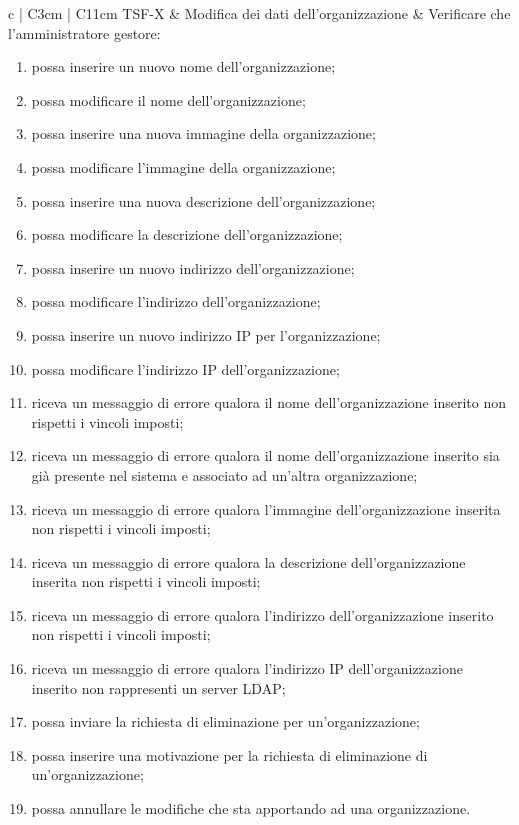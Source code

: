 {\begin{longtable}{ c | C{3cm} | C{11cm} }
TSF-X & Modifica dei dati dell'organizzazione &
Verificare che l'amministratore gestore:
\begin{enumerate}
    \item possa inserire un nuovo nome dell'organizzazione;
    \item possa modificare il nome dell'organizzazione;
    \item possa inserire una nuova immagine della organizzazione;
    \item possa modificare l'immagine della organizzazione;
    \item possa inserire una nuova descrizione dell’organizzazione;
    \item possa modificare la descrizione dell’organizzazione;
    \item possa inserire un nuovo indirizzo dell’organizzazione;
    \item possa modificare l'indirizzo dell’organizzazione;
    \item possa inserire un nuovo indirizzo IP per l'organizzazione;
    \item possa modificare l'indirizzo IP dell'organizzazione;
    \item riceva un messaggio di errore qualora il nome dell'organizzazione inserito non rispetti i vincoli imposti;
    \item riceva un messaggio di errore qualora il nome dell'organizzazione inserito sia già presente nel sistema e associato ad un'altra organizzazione;
    \item riceva un messaggio di errore qualora l'immagine dell'organizzazione inserita non rispetti i vincoli imposti;
    \item riceva un messaggio di errore qualora la descrizione dell'organizzazione inserita non rispetti i vincoli imposti;
    \item riceva un messaggio di errore qualora l'indirizzo dell'organizzazione inserito non rispetti i vincoli imposti;
    \item riceva un messaggio di errore qualora l'indirizzo IP dell'organizzazione inserito non rappresenti un server LDAP;
    \item possa inviare la richiesta di eliminazione per un'organizzazione;
    \item possa inserire una motivazione per la richiesta di eliminazione di un'organizzazione;
    \item possa annullare le modifiche che sta apportando ad una organizzazione.
\end{enumerate} \\


\end{longtable}}
